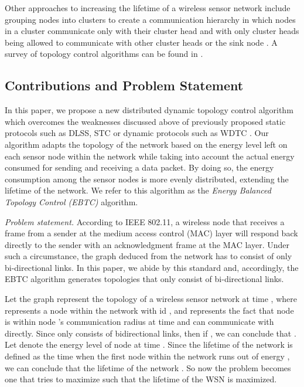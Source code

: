 \documentclass[journal,12pt,onecolumn]{IEEEtran}
\begin{document}
Other approaches to increasing the lifetime of a wireless sensor
network include grouping nodes into clusters to create a communication
hierarchy in which nodes in a cluster communicate only with their
cluster head and with only cluster heads being allowed to communicate with
other cluster heads or the sink node
\cite{AbaAna2009,KolPav2011}. A survey of topology control
algorithms can be found in \cite{MahMin2008,San2005}. 



\subsection{Contributions and Problem Statement}












In this paper, we propose a new distributed dynamic topology control algorithm
which overcomes the weaknesses discussed above of previously proposed
static protocols such as DLSS\cite{LiHou2005-1313}, STC \cite{SetGer2007} or dynamic protocols such as WDTC \cite{SunYua2011}. 
Our algorithm adapts the topology of the network based on the energy level
left on each sensor node within the network while taking into account
the actual energy consumed for sending and receiving a data
packet. By doing so, the energy consumption among the sensor nodes
is more evenly distributed, extending the lifetime of the network. We
refer to this algorithm as the {\em Energy Balanced Topology Control
  (EBTC)} algorithm.

{\em Problem statement.}
According to IEEE 802.11, a wireless node that receives a
frame from a sender at the medium access control (MAC) layer will
respond back directly to the sender with an acknowledgment frame at
the MAC layer. Under such a circumstance, the graph deduced from the
network has to consist of only bi-directional links. In this paper, we
abide by this standard and, accordingly, the EBTC algorithm generates
topologies that only consist of bi-directional links.

Let the graph  represent the topology of a wireless sensor
network at time , where  represents a node within the
network with id , and  represents the fact
that node  is within node 's communication radius at time
 and can communicate with  directly. Since  only
consists of bidirectional links, then if , we can
conclude that . Let  denote the energy
level of node  at time . Since the lifetime of the network
is defined as the time when the first node within the network runs
out of energy \cite{SunYua2011}, we can conclude that the
lifetime of the network . So now the
problem becomes one that tries to maximize  such that the
lifetime of the WSN is maximized.
\end{document}

